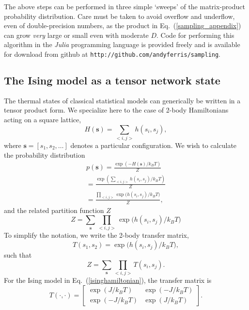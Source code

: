 \documentclass[aps,prl,nopacs,twocolumn]{revtex4}
\newcommand {\Eqn}[1] {Eq.~(\ref{#1})}
\begin{document}
The above steps can be performed in three simple `sweeps' of the matrix-product probability distribution. Care must be taken to avoid overflow and underflow, even of double-precision numbers, as the product in \Eqn{sampling_appendix} can grow \emph{very} large or small even with moderate $D$. Code for performing this algorithm in the \emph{Julia} programming language is provided freely and is available for download from github at \texttt{http://github.com/andyferris/sampling}.

\subsection{The Ising model as a tensor network state}

The thermal states of classical statistical models can generically be written in a tensor product form. We specialize here to the case of 2-body Hamiltonians acting on a square lattice, 
\begin{equation}
   H(\mathbf{s}) = \sum_{<i,j>} h(s_i,s_j),
\end{equation}
where $\mathbf{s} = [s_1,s_2,\dots]$ denotes a particular configuration. We wish to calculate the probability distribution
\begin{multline}
    p(\mathbf{s}) = \frac{\exp(-H(\mathbf{s})/k_B T)}{Z} \\
    = \frac{\exp\left(\sum_{<i,j>} h(s_i,s_j) / k_B T \right)}{Z} \\
    = \frac{\prod_{<i,j>} \exp\bigl(h(s_i,s_j)/k_B T\bigr)}{Z},
\end{multline}
and the related partition function $Z$
\begin{equation}
  Z = \sum_{\mathbf{s}} \prod_{<i,j>} \exp\bigl(h(s_i,s_j) / k_B T\bigr)
\end{equation}
To simplify the notation, we write the 2-body transfer matrix,
\begin{equation}
    T(s_1,s_2) = \exp\bigl(h(s_i,s_j) / k_B T\bigr),
\end{equation}
such that
\begin{equation}
  Z = \sum_{\mathbf{s}} \prod_{<i,j>} T(s_i,s_j) .
\end{equation}
For the Ising model in \Eqn{isinghamiltonian}, the transfer matrix is
\begin{equation}
    T(\cdot,\cdot) = \left[ \begin{array}{cc} \exp(J/k_B T) & \exp(-J/k_B T) \\ \exp(-J/k_B T) & \exp(J/k_B T) \end{array} \right].
\end{equation}
\end{document}
